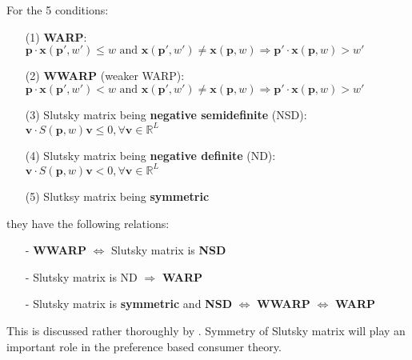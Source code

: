 For the 5 conditions:
    \begin{enumerate}
        \item[(1)] \textbf{WARP}: $\mathbf{p}\cdot \mathbf{x}(\mathbf{p}',w')\leq w\text{ and }\mathbf{x}(\mathbf{p}',w')\neq \mathbf{x}(\mathbf{p},w)\Rightarrow \mathbf{p}'\cdot\mathbf{x}(\mathbf{p},w)>w'$
        \item[(2)] \textbf{WWARP} (weaker WARP): $\mathbf{p}\cdot \mathbf{x}(\mathbf{p}',w')< w\text{ and }\mathbf{x}(\mathbf{p}',w')\neq \mathbf{x}(\mathbf{p},w)\Rightarrow \mathbf{p}'\cdot\mathbf{x}(\mathbf{p},w)>w'$
        \item[(3)] Slutsky matrix being \textbf{negative semidefinite} (NSD): $\mathbf{v}\cdot S(\mathbf{p},w)\mathbf{v}\leq 0, \forall \mathbf{v}\in\mathbb{R}^L$
        \item[(4)] Slutsky matrix being \textbf{negative definite} (ND): $\mathbf{v}\cdot S(\mathbf{p},w)\mathbf{v}< 0, \forall \mathbf{v}\in\mathbb{R}^L$
        \item[(5)] Slutksy matrix being \textbf{symmetric} 
    \end{enumerate}

    they have the following relations:
    \begin{enumerate}
        \item[-] \textbf{WWARP} $\Leftrightarrow$ Slutsky matrix is \textbf{NSD} 
        \item[-] Slutsky matrix is ND $\Rightarrow$ \textbf{WARP} 
        \item[-] Slutsky matrix is \textbf{symmetric} and \textbf{NSD} $\Leftrightarrow$ \textbf{WWARP} $\Leftrightarrow$ \textbf{WARP}
    \end{enumerate}
    
    This is discussed rather thoroughly by \citet{kihlstrom1976demand}. Symmetry of Slutsky matrix will play an important role in the preference based consumer theory.